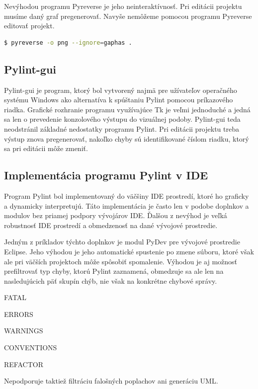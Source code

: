 \documentclass[11pt,oneside,final]{fithesis2}
\begin{document}
		Nevýhodou programu Pyreverse je jeho neinteraktívnosť. Pri editácii projektu musíme daný graf pregenerovať. Navyše nemôžeme pomocou programu Pyreverse editovať projekt.		
		
\begin{lstlisting}[language=bash]	
$ pyreverse -o png --ignore=gaphas .
\end{lstlisting}

 
 
	\subsection{Pylint-gui}
	
	Pylint-gui je program, ktorý bol vytvorený najmä pre užívateľov operačného systému Windows ako alternatíva k spúštaniu Pylint pomocou príkazového riadka. Grafické rozhranie programu využívajúce Tk je veľmi jednoduché a jedná sa len o prevedenie konzolového výstupu do vizuálnej podoby. Pylint-gui teda neodstránil základné nedostatky programu Pylint. Pri editácii projektu treba výstup znova pregenerovať, nakoľko chyby sú identifikované číslom riadku, ktorý sa pri editácii môže zmeniť.
	
	\subsection{Implementácia programu Pylint v IDE}
 
	Program Pylint bol implementovaný do väčšiny IDE prostredí, ktoré ho graficky a dynamicky interpretujú. Táto implementácia je často len v podobe doplnkov a modulov bez priamej podpory vývojárov IDE. Ďalšou z nevýhod je veľká robustnosť IDE prostredí a obmedzenosť na dané vývojové prostredie. 
	
	Jedným z príkladov týchto doplnkov je modul PyDev pre vývojové prostredie Eclipse. Jeho výhodou je jeho automatické spustenie po zmene súboru, ktoré však ale pri väčších projektoch môže spôsobiť spomalenie. Výhodou je aj možnosť prefiltrovať typ chyby, ktorú Pylint zaznamená, obmedzuje sa ale len na nasledujúcich päť skupín chýb, nie však na konkrétne chybové správy.

\begin{list}{•}{}
\item FATAL
\item ERRORS
\item WARNINGS
\item CONVENTIONS
\item REFACTOR
\end{list}
Nepodporuje taktiež filtráciu falošných poplachov ani generáciu UML.
	
\end{document}
